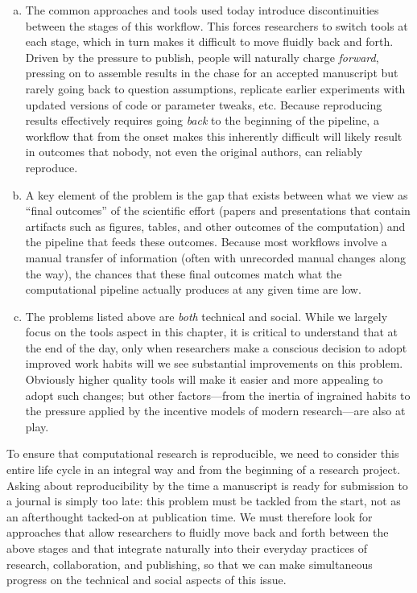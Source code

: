 \documentclass[ChapterTOCs,krantz2]{krantz} %
\begin{document}
\begin{enumerate}[(a)]

\item The common approaches and tools used today introduce discontinuities
  between the stages of this workflow. This forces researchers to switch tools
  at each stage, which in turn makes it difficult to move fluidly back and forth.
  Driven by the pressure to publish, people will naturally charge
  \emph{forward}, pressing on to assemble results in the chase for an accepted
  manuscript but rarely going back to question assumptions, replicate earlier
  experiments with updated versions of code or parameter tweaks, etc.  Because
  reproducing results effectively requires going \emph{back} to the
  beginning of the pipeline, a workflow that from the onset makes this
  inherently difficult will likely result in outcomes that nobody, not even the
  original authors, can reliably reproduce.

\item A key element of the problem is the gap that exists between what
  we view as ``final outcomes'' of the scientific effort (papers and
  presentations that contain artifacts such as figures, tables, and other
  outcomes of the computation) and the pipeline that feeds these outcomes.
  Because most workflows involve a manual transfer of information (often with
  unrecorded manual changes along the way), the chances that these final
  outcomes match what the computational pipeline actually produces at any
  given time are low.

\item The problems listed above are \emph{both} technical and social.  While we
  largely focus on the tools aspect in this chapter, it is critical to understand
  that at the end of the day, only when researchers make a conscious decision to
  adopt improved work habits will we see substantial improvements on this problem.
  Obviously higher quality tools will make it easier and more appealing to
  adopt such changes; but other factors---from the
  inertia of ingrained habits to the pressure applied by the
  incentive models of modern research---are also at play.
\end{enumerate}
To ensure that computational research is reproducible, we need
to consider this entire life cycle in an integral way and from the beginning of
a research project.  Asking about reproducibility by the time a manuscript is
ready for submission to a journal is simply too late: this problem must be
tackled from the start, not as an afterthought tacked-on at publication time.
We must therefore look for approaches that allow researchers to fluidly move
back and forth between the above stages and that integrate naturally into their
everyday practices of research, collaboration, and publishing, so that we can
make simultaneous progress on the technical and social aspects of this issue.
\end{document}
